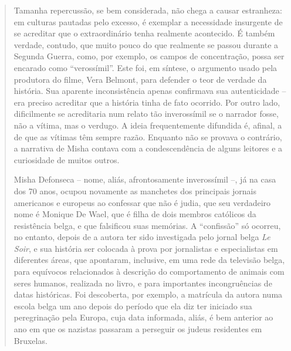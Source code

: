 \begin{quote}
Tamanha repercussão, se bem considerada, não chega a causar estranheza:
em culturas pautadas pelo excesso, é exemplar a necessidade insurgente
de se acreditar que o extraordinário tenha realmente acontecido. É
também verdade, contudo, que muito pouco do que realmente se passou
durante a Segunda Guerra, como, por exemplo, os campos de concentração,
possa ser encarado como ``verossímil''. Este foi, em síntese, o
argumento usado pela produtora do filme, Vera Belmont, para defender o
teor de verdade da história. Sua aparente inconsistência apenas
confirmava sua autenticidade -- era preciso acreditar que a história
tinha de fato ocorrido. Por outro lado, dificilmente se acreditaria num
relato tão inverossímil se o narrador fosse, não a vítima, mas o
verdugo. A ideia frequentemente difundida é, afinal, a de que as vítimas
têm sempre razão. Enquanto não se provava o contrário, a narrativa de
Misha contava com a condescendência de alguns leitores e a curiosidade
de muitos outros.

Misha Defonseca -- nome, aliás, afrontosamente inverossímil --, já na
casa dos 70 anos, ocupou novamente as manchetes dos principais jornais
americanos e europeus ao confessar que não é judia, que seu verdadeiro
nome é Monique De Wael, que é filha de dois membros católicos da
resistência belga, e que falsificou suas memórias. A ``confissão'' só
ocorreu, no entanto, depois de a autora ter sido investigada pelo jornal
belga \emph{Le Soir}, e sua história ser colocada à prova por
jornalistas e especialistas em diferentes áreas, que apontaram,
inclusive, em uma rede da televisão belga, para equívocos relacionados à
descrição do comportamento de animais com seres humanos, realizada no
livro, e para importantes incongruências de datas históricas. Foi
descoberta, por exemplo, a matrícula da autora numa escola belga um ano
depois do período que ela diz ter iniciado sua peregrinação pela Europa,
cuja data informada, aliás, é bem anterior ao ano em que os nazistas
passaram a perseguir os judeus residentes em Bruxelas.


\end{quote}
